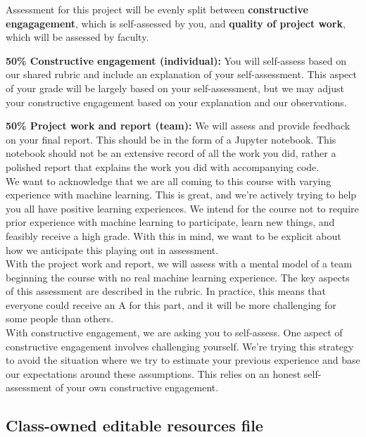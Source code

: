 \documentclass{tufte-handout}
\begin{document}
Assessment for this project will be evenly split between \textbf{constructive engagagement}, which is self-assessed by you, and \textbf{quality of project work}, which will be assessed by faculty.

\vspace{1em}

\textbf{50\% Constructive engagement (individual):} You will self-assess based on our shared rubric and include an explanation of your self-assessment. This aspect of your grade will be largely based on your self-assessment, but we may adjust your constructive engagement based on your explanation and our observations.\\
\vspace{1em}

\textbf{50\% Project work and report (team):}  We will assess and provide feedback on your final report. This should be in the form of a Jupyter notebook. This notebook should not be an extensive record of all the work you did, rather a polished report that explains the work you did with accompanying code. \\

\vspace{1em}
We want to acknowledge that we are all coming to this course with varying experience with machine learning. This is great, and we’re actively trying to help you all have positive learning experiences. We intend for the course not to require prior experience with machine learning to participate, learn new things, and feasibly receive a high grade. With this in mind, we want to be explicit about how we anticipate this playing out in assessment. \\
With the project work and report, we will assess with a mental model of a team beginning the course with no real machine learning experience. The key aspects of this assessment are described in the rubric. In practice, this means that everyone could receive an A for this part, and it will be more challenging for some people than others. \\
With constructive engagement, we are asking you to self-assess. One aspect of constructive engagement involves challenging yourself. 
We’re trying this strategy to avoid the situation where we try to estimate your previous experience and base our expectations around these assumptions. This relies on an honest self-assessment of your own constructive engagement. 

\subsection{Class-owned editable resources file}
\end{document}
